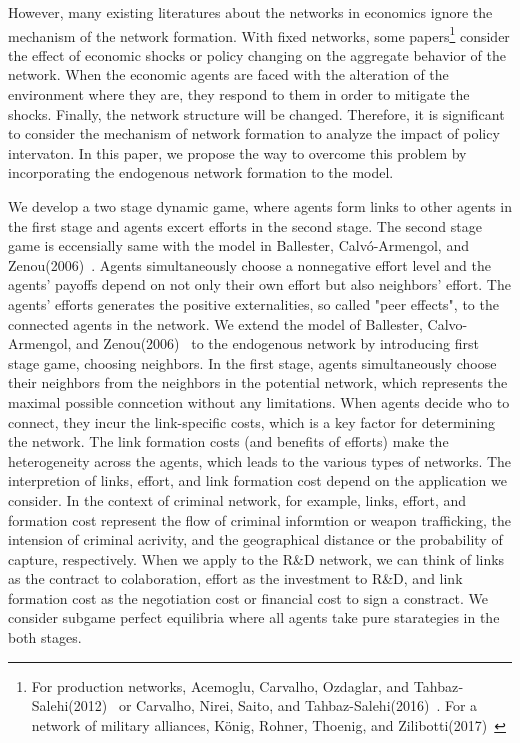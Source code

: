\documentclass[12pt]{article}
\theoremstyle{definition}
\begin{document}
However, many existing literatures about the networks in economics ignore the mechanism of the network formation.
With fixed networks, some papers\footnote{For production networks, Acemoglu, Carvalho, Ozdaglar, and Tahbaz‐Salehi(2012)~\cite{origin} or Carvalho, Nirei, Saito, and Tahbaz-Salehi(2016)~\cite{nirei}. For a network of military alliances, K\"{o}nig, Rohner, Thoenig, and Zilibotti(2017)~\cite{conflict}} consider the effect of economic shocks or policy changing on the aggregate behavior of the network.
When the economic agents are faced with the alteration of the environment where they are, they respond to them in order to mitigate the shocks.
Finally, the network structure will be changed.
Therefore, it is significant to consider the mechanism of network formation to analyze the impact of policy intervaton.
In this paper, we propose the way to overcome this problem by incorporating the endogenous network formation to the model.

We develop a two stage dynamic game, where agents form links to other agents in the first stage and agents excert efforts in the second stage.
The second stage game is eccensially same with the model in Ballester, Calv\'{o}-Armengol, and Zenou(2006)~\cite{whowho}.
Agents simultaneously choose a nonnegative effort level and the agents' payoffs depend on not only their own effort but also neighbors' effort.
The agents' efforts generates the positive externalities, so called "peer effects", to the connected agents in the network.
We extend the model of Ballester, Calvo-Armengol, and Zenou(2006)~\cite{whowho} to the endogenous network by introducing first stage game, choosing neighbors.
In the first stage, agents simultaneously choose their neighbors from the neighbors in the potential network, which represents the maximal possible conncetion without any limitations.
When agents decide who to connect, they incur the link-specific costs, which is a key factor for determining the network.
The link formation costs (and benefits of efforts) make the heterogeneity across the agents, which leads to the various types of networks.
The interpretion of links, effort, and link formation cost depend on the application we consider.
In the context of criminal network, for example, links, effort, and formation cost represent the flow of criminal informtion or weapon trafficking, the intension of criminal acrivity, and the geographical distance or the probability of capture, respectively.
When we apply to the R\&D network, we can think of links as the contract to colaboration, effort as the investment to R\&D, and link formation cost as the negotiation cost or financial cost to sign a constract.
We consider subgame perfect equilibria where all agents take pure starategies in the both stages.
\end{document}
